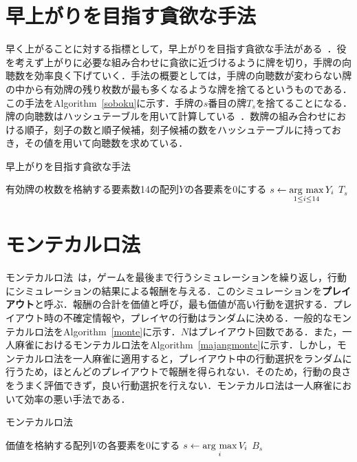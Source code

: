 \section{早上がりを目指す貪欲な手法}
早く上がることに対する指標として，早上がりを目指す貪欲な手法がある~\cite{zentu}．役を考えず上がりに必要な組み合わせに貪欲に近づけるように牌を切り，手牌の向聴数を効率良く下げていく．手法の概要としては，手牌の向聴数が変わらない牌の中から有効牌の残り枚数が最も多くなるような牌を捨てるというものである．この手法をAlgorithm~\ref{soboku}に示す．手牌の$s$番目の牌$T_s$を捨てることになる．牌の向聴数はハッシュテーブルを用いて計算している~\cite{syanten}．数牌の組み合わせにおける順子，刻子の数と順子候補，刻子候補の数をハッシュテーブルに持っておき，その値を用いて向聴数を求めている．

\begin{algorithm}[t]
\caption{早上がりを目指す貪欲な手法}
\label{soboku}
	有効牌の枚数を格納する要素数14の配列$Y$の各要素を0にする\;
 $s \leftarrow \mathop{\rm arg~max}\limits_{1 \le i \le 14} Y_i$\;
 \Return $T_s$\;
\end{algorithm}

\section{モンテカルロ法}
モンテカルロ法~\cite{montecarlo}は，ゲームを最後まで行うシミュレーションを繰り返し，行動にシミュレーションの結果による報酬を与える．このシミュレーションを\textbf{プレイアウト}と呼ぶ．報酬の合計を価値と呼び，最も価値が高い行動を選択する．プレイアウト時の不確定情報や，プレイヤの行動はランダムに決める．一般的なモンテカルロ法をAlgorithm~\ref{monte}に示す．$N$はプレイアウト回数である．また，一人麻雀におけるモンテカルロ法をAlgorithm~\ref{majangmonte}に示す．しかし，モンテカルロ法を一人麻雀に適用すると，プレイアウト中の行動選択をランダムに行うため，ほとんどのプレイアウトで報酬を得られない．そのため，行動の良さをうまく評価できず，良い行動選択を行えない．モンテカルロ法は一人麻雀において効率の悪い手法である．

\begin{algorithm}[t]
\caption{モンテカルロ法}
\label{monte}
	価値を格納する配列$V$の各要素を0にする\;
	$s \leftarrow \mathop{\rm arg~max}\limits_i V_i$\;
	\Return $B_s$\;
\end{algorithm}

